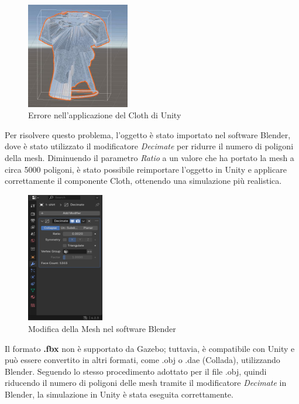 \documentclass[11pt]{report}
\begin{document}
\begin{figure}[H]
    \centering
    \includegraphics[width=0.4\textwidth]{images/cloth_error.PNG}
    \caption{Errore nell'applicazione del Cloth di Unity}
    \label{fig:cloth_error}
\end{figure}

Per risolvere questo problema, l'oggetto è stato importato nel software Blender, dove è stato utilizzato il modificatore \textit{Decimate} per ridurre il numero di poligoni della mesh. Diminuendo il parametro \textit{Ratio} a un valore che ha portato la mesh a circa 5000 poligoni, è stato possibile reimportare l'oggetto in Unity e applicare correttamente il componente Cloth, ottenendo una simulazione più realistica.

\begin{figure}[H]
    \centering
    \includegraphics[width=0.3\textwidth]{images/blender_ratio.PNG}
    \caption{Modifica della Mesh nel software Blender}
    \label{fig:blender_ratio}
\end{figure}

Il formato \textbf{.fbx} non è supportato da Gazebo; tuttavia, è compatibile con Unity e può essere convertito in altri formati, come .obj o .dae (Collada), utilizzando Blender. Seguendo lo stesso procedimento adottato per il file .obj, quindi riducendo il numero di poligoni delle mesh tramite il modificatore \textit{Decimate} in Blender, la simulazione in Unity è stata eseguita correttamente.
\end{document}
